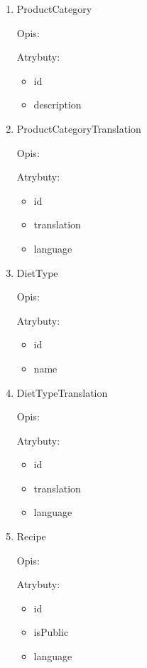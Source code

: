 \begin{enumerate}[label={\textbf{KAT/\protect\threedigits{\theenumi}}}, wide, labelwidth=!, labelindent=0pt]
    \item \label{kat:ProductCategory} ProductCategory

    Opis: \lipsum[1]
    \par
    Atrybuty:
    \begin{itemize}
        \item id
        \item description
    \end{itemize}

    \item \label{kat:ProductCategoryTranslation} ProductCategoryTranslation

    Opis: \lipsum[1]
    \par
    Atrybuty:
    \begin{itemize}
        \item id
        \item translation
        \item language
    \end{itemize}

    \item \label{kat:DietType} DietType

    Opis: \lipsum[1]
    \par
    Atrybuty:
    \begin{itemize}
        \item id
        \item name
    \end{itemize}

    \item \label{kat:DietTypeTranslation} DietTypeTranslation

    Opis: \lipsum[1]
    \par
    Atrybuty:
    \begin{itemize}
        \item id
        \item translation
        \item language
    \end{itemize}

    \item \label{kat:Recipe} Recipe

    Opis: \lipsum[1]
    \par
    Atrybuty:
    \begin{itemize}
        \item id
        \item isPublic
        \item language
    \end{itemize}


\end{enumerate}
